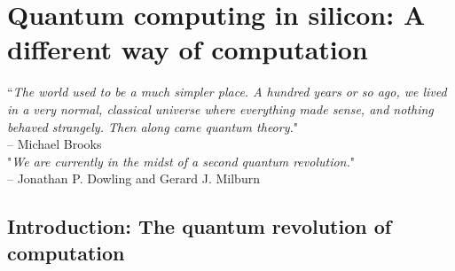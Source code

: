 
\chapter{Quantum computing in silicon: A different way of computation} %

\label{Chapter1} %

\noindent\hrulefill
\vspace{0.5cm} %
\begin{flushright}
        ``\emph{The world used to be a much simpler place. A hundred years or so ago, we lived in a very normal, classical universe where everything made sense, and nothing behaved strangely. Then along came quantum theory.}"
\\ 
-- Michael Brooks\\

"\emph{We are currently in the midst of a second quantum revolution.}"
\\ 
-- Jonathan P. Dowling and Gerard J. Milburn\\
\end{flushright}

\vspace{0.5cm}


\noindent\hrulefill
\clearpage



\section{Introduction: The quantum revolution of computation}


